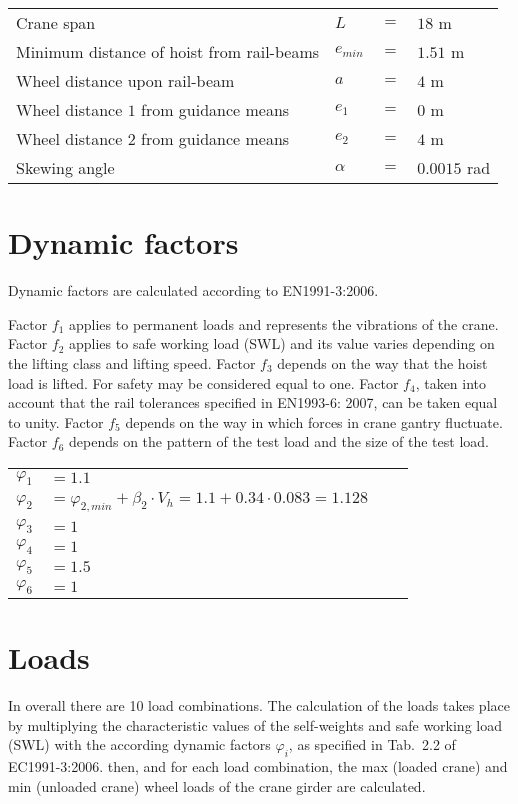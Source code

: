 \documentclass[a4paper,10pt, final, oneside, fleqn, onecolumn]{article}	%
\begin{document}
\begin{tabular}{llcl}
    Crane span                                      &$L$          &$=$ &$18$ m \\
    Minimum distance of hoist from rail-beams       &$e_{min}$    &$=$ &$1.51$ m \\
    Wheel distance upon rail-beam                   &$a$          &$=$ &$4$ m \\
    Wheel distance $1$ from guidance means          &$e_1$        &$=$ &$0$ m \\
    Wheel distance $2$ from guidance means          &$e_2$        &$=$ &$4$ m \\
    Skewing angle                                   &$α$          &$=$ &$0.0015$ rad
\end{tabular}

\section{Dynamic factors}
Dynamic factors are calculated according to EΝ1991-3:2006.

Factor $ f_1 $ applies to permanent loads and represents the vibrations of the crane. 
Factor $ f_2 $ applies to safe working load (SWL) and its value varies depending on the lifting class 
and lifting speed. Factor $ f_3 $ depends on the way that the hoist load is lifted. For safety may be 
considered equal to one. Factor $ f_4 $, taken into account that the rail tolerances specified in 
EN1993-6: 2007, can be taken equal to unity. Factor $ f_5 $ depends on the way in which forces in 
crane gantry fluctuate. Factor $ f_6 $ depends on the pattern of the test load and the size of the 
test load.

\begin{tabular}{llcr}
    $φ_1$ &$= 1.1 $ \\
    $φ_2$ &$= φ_{2,min} + β_2 \cdot V_h = 1.1 + 0.34 \cdot 0.083 = 1.128 $ \\
    $φ_3$ &$= 1 $ \\
    $φ_4$ &$= 1 $ \\
    $φ_5$ &$= 1.5 $ \\
    $φ_6$ &$= 1 $
\end{tabular}

\section{Loads}

In overall there are 10 load combinations. The calculation of the loads takes place by multiplying 
the characteristic values of the self-weights and safe working load (SWL) with the according dynamic 
factors $φ_i$, as specified in Tab.~2.2 of EC1991-3:2006. then, and for each load combination, the max 
(loaded crane) and min (unloaded crane) wheel loads of the crane girder are calculated. 
\end{document}
